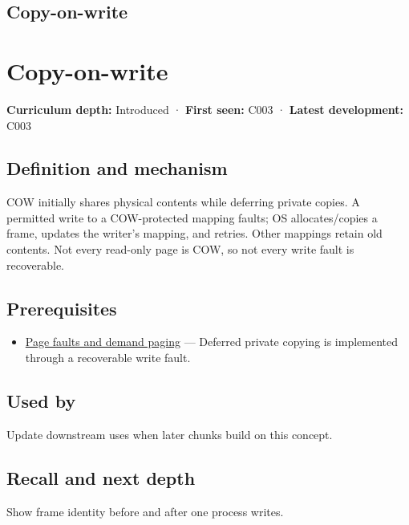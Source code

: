 \hypertarget{appendix-7a06e5baac04}{}
\section*{Copy-on-write}
\chapter{Copy-on-write}\label{appendix-7a06e5baac04-copy-on-write}

\textbf{Curriculum depth:} Introduced · \textbf{First seen:} C003 · \textbf{Latest development:} C003

\section{Definition and mechanism}\label{appendix-7a06e5baac04-definition-and-mechanism}

COW initially shares physical contents while deferring private copies. A permitted write to a COW-protected mapping faults; OS allocates/copies a frame, updates the writer's mapping, and retries. Other mappings retain old contents. Not every read-only page is COW, so not every write fault is recoverable.

\section{Prerequisites}\label{appendix-7a06e5baac04-prerequisites}

\begin{itemize}
\tightlist
\item
  \hyperref[appendix-cc0909a7ef14]{Page faults and demand paging} --- Deferred private copying is implemented through a recoverable write fault.
\end{itemize}

\section{Used by}\label{appendix-7a06e5baac04-used-by}

Update downstream uses when later chunks build on this concept.

\section{Recall and next depth}\label{appendix-7a06e5baac04-recall-and-next-depth}

Show frame identity before and after one process writes.

